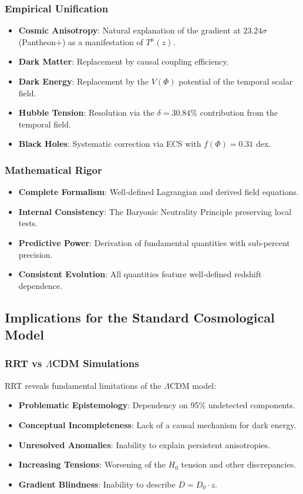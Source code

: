 \documentclass[12pt,a4paper]{article}
\begin{document}
\subsubsection{Empirical Unification}
\begin{itemize}
    \item \textbf{Cosmic Anisotropy}: Natural explanation of the gradient at $23.24\sigma$ (Pantheon+) as a manifestation of $T^\mu(z)$.
    \item \textbf{Dark Matter}: Replacement by causal coupling efficiency.
    \item \textbf{Dark Energy}: Replacement by the $V(\Phi)$ potential of the temporal scalar field.
    \item \textbf{Hubble Tension}: Resolution via the $\delta = 30.84\%$ contribution from the temporal field.
    \item \textbf{Black Holes}: Systematic correction via ECS with $f(\Phi) = 0.31$ dex.
\end{itemize}

\subsubsection{Mathematical Rigor}
\begin{itemize}
    \item \textbf{Complete Formalism}: Well-defined Lagrangian and derived field equations.
    \item \textbf{Internal Consistency}: The Baryonic Neutrality Principle preserving local tests.
    \item \textbf{Predictive Power}: Derivation of fundamental quantities with sub-percent precision.
    \item \textbf{Consistent Evolution}: All quantities feature well-defined redshift dependence.
\end{itemize}

\subsection{Implications for the Standard Cosmological Model}

\subsubsection{RRT vs \texorpdfstring{$\Lambda$}{Lambda}CDM Simulations}
RRT reveals fundamental limitations of the $\Lambda$CDM model:
\begin{itemize}
    \item \textbf{Problematic Epistemology}: Dependency on 95\% undetected components.
    \item \textbf{Conceptual Incompleteness}: Lack of a causal mechanism for dark energy.
    \item \textbf{Unresolved Anomalies}: Inability to explain persistent anisotropies.
    \item \textbf{Increasing Tensions}: Worsening of the $H_0$ tension and other discrepancies.
    \item \textbf{Gradient Blindness}: Inability to describe $D = D_0 \cdot z$.
\end{itemize}
\end{document}
